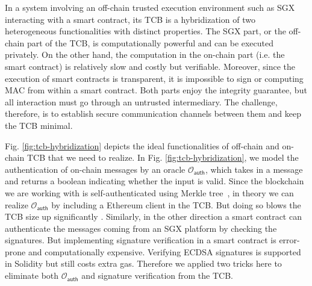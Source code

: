 In a system involving an off-chain trusted execution environment such as SGX
interacting with a smart contract, its TCB is a hybridization of two
heterogeneous functionalities with distinct properties.  The SGX part, or the
off-chain part of the TCB, is computationally powerful and can be executed
privately. On the other hand, the computation in the on-chain part (i.e. the
smart contract) is relatively slow and costly but verifiable. Moreover,
since the execution of smart contracts is transparent, it is impossible to sign
or computing MAC from within a smart contract. Both parts enjoy the integrity guarantee,
but all interaction must go through an untrusted intermediary. 
The challenge, therefore, is to establish secure communication channels between
them and keep the TCB minimal. 

Fig. \ref{fig:tcb-hybridization} depicts the
ideal functionalities of off-chain and on-chain TCB that we need to realize.
In Fig. \ref{fig:tcb-hybridization}, we model the authentication of on-chain
messages by an oracle $\mathcal{O}_\textsf{auth}$, which takes in a message
and returns a boolean indicating whether the input is valid.
Since the blockchain we are working with is self-authenticated using Merkle
tree~, in theory we can realize $\mathcal{O}_\textsf{auth}$
by including a Ethereum client in the TCB. But doing so blows the TCB size up 
significantly .
Similarly, in the other direction a smart contract can
authenticate the messages coming from an SGX platform by checking the
signatures. But implementing
signature verification in a smart contract is error-prone and 
computationally expensive. Verifying ECDSA signatures
is supported in Solidity  but still costs extra gas.
Therefore we applied two tricks here to eliminate both $\mathcal{O}_\textsf{auth}$
and signature verification from the TCB.


\iffalse
As described in Section~\ref{sec:architecture}, \tc has two trusted components: the \encname and \tcont.
These components must communicate with each other, but can only do so over insecure channels (through the \medname).
Moreover, these components comprise very different properties.
\tcont resides on the blockchain where users can interact directly with \tc and all computation is verifiable, expensive, and transparent.
The \encname provides a private and less expensive environment, but all interaction (user or otherwise) must go through an untrusted intermediary.

The simplest way to ensure authentic communication between the components is to have both perform verification;
\tcont receives signed messages from the \encname and verifies the signatures,
and the \encname receives raw blocks and verifies that they are well-formed.
Unfortunately, both of these verification mechanisms require a large amount of computation and complex code.
\fi

